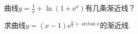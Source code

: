 \begin{xiti}
%		
%		
%	
\item 曲线$y = \frac { 1 } { x } + \ln \left( 1 + \mathrm { e } ^ { x } \right)$有几条渐近线？
\item 求曲线$y = ( x - 1 ) \mathrm { e } ^ { \frac { \pi } { 2 } + \arctan x }$的渐近线.
\end{xiti}



